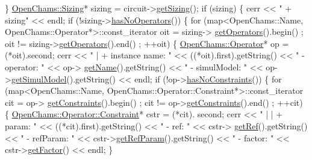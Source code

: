 \begin{DoxyCodeInclude}
    \}
    \hyperlink{class_open_chams_1_1_sizing}{OpenChams::Sizing}* sizing = circuit->\hyperlink{class_open_chams_1_1_circuit_a0ce52bc8747f684ec0123faa8ff97b6d}{getSizing}();
    \textcolor{keywordflow}{if} (sizing) \{
        cerr << \textcolor{stringliteral}{" + sizing"} << endl;
        \textcolor{keywordflow}{if} (!sizing->\hyperlink{class_open_chams_1_1_sizing_ac8a299add4fd32ff8bf99c889f4a79a6}{hasNoOperators}()) \{
            \textcolor{keywordflow}{for} (map<OpenChams::Name, OpenChams::Operator*>::const\_iterator oit = sizing->
      \hyperlink{class_open_chams_1_1_sizing_ad35c9083b30dac45186f4f0eb49b435d}{getOperators}().begin() ; oit != sizing->\hyperlink{class_open_chams_1_1_sizing_ad35c9083b30dac45186f4f0eb49b435d}{getOperators}().end() ; ++oit) \{
                \hyperlink{class_open_chams_1_1_operator}{OpenChams::Operator}* op = (*oit).second;
                cerr << \textcolor{stringliteral}{" | + instance name: "} << ((*oit).first).getString() << \textcolor{stringliteral}{" - operator: "} << op->
      \hyperlink{class_open_chams_1_1_operator_a2858c0c4e8b5108f041237cf5a802029}{getName}().getString() << \textcolor{stringliteral}{" - simulModel: "} << op->\hyperlink{class_open_chams_1_1_operator_aa189a1b119b44a8877c478e2d2357a89}{getSimulModel}().getString() << endl;
                \textcolor{keywordflow}{if} (!op->\hyperlink{class_open_chams_1_1_operator_a9ac68ad3e43b1649a8582c8685f4886d}{hasNoConstraints}()) \{
                    \textcolor{keywordflow}{for} (map<OpenChams::Name, OpenChams::Operator::Constraint*>::const\_iterator cit = op->
      \hyperlink{class_open_chams_1_1_operator_a0002889b395185948d7c71b261343620}{getConstraints}().begin() ; cit != op->\hyperlink{class_open_chams_1_1_operator_a0002889b395185948d7c71b261343620}{getConstraints}().end() ; ++cit) \{
                        \hyperlink{class_open_chams_1_1_operator_1_1_constraint}{OpenChams::Operator::Constraint}* cstr = (*cit).
      second;
                        cerr << \textcolor{stringliteral}{" | | + param: "} << ((*cit).first).getString() << \textcolor{stringliteral}{" - ref: "} << cstr->
      \hyperlink{class_open_chams_1_1_operator_1_1_constraint_a07cf74adaf661f0aaaa1818d24c2243d}{getRef}().getString() << \textcolor{stringliteral}{" - refParam: "} << cstr->\hyperlink{class_open_chams_1_1_operator_1_1_constraint_a621539b1a4f31053649031c8034b0bd3}{getRefParam}().getString() << \textcolor{stringliteral}{" - factor: 
      "} << cstr->\hyperlink{class_open_chams_1_1_operator_1_1_constraint_a973fc85365f2d3f07007d88a90d7ab1d}{getFactor}() << endl;
                    \}

\end{DoxyCodeInclude}
